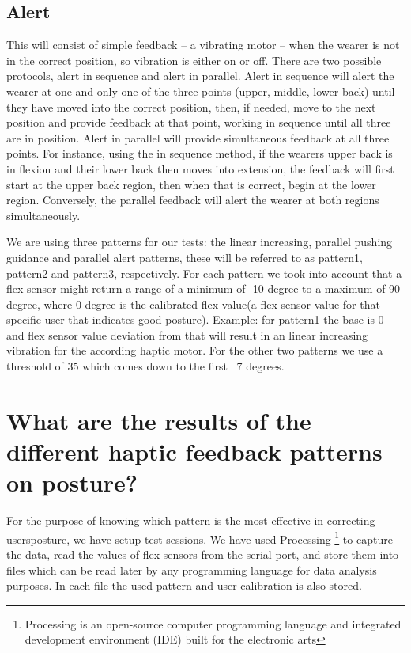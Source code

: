 \documentclass[sigconf]{acmart}
\begin{document}
\subsection{Alert}
This will consist of simple feedback – a vibrating motor – when the wearer is not in the correct position, so vibration is either on or off. There are two possible protocols, alert in sequence and alert in parallel. Alert in sequence will alert the wearer at one and only one of the three points (upper, middle, lower back) until they have moved into the correct position, then, if needed, move to the next position and provide feedback at that point, working in sequence until all three are in position. Alert in parallel will provide simultaneous feedback at all three points. For instance, using the in sequence method, if the wearer\textquotesingle s upper back is in flexion and their lower back then moves into extension, the feedback will first start at the upper back region, then when that is correct, begin at the lower region. Conversely, the parallel feedback will alert the wearer at both regions simultaneously. 



We are using three patterns for our tests: the linear increasing, parallel pushing guidance and parallel alert patterns, these will be referred to as pattern1, pattern2 and pattern3, respectively. For each pattern we took into account that a flex sensor might return a range of a minimum of -10 degree to a maximum of 90 degree, where 0 degree is the calibrated flex value(a flex sensor value for that specific user that indicates good posture). 
Example: for pattern1 the base is 0 and flex sensor value deviation from that will result in an linear increasing vibration for the according haptic motor. For the other two patterns we use a threshold of 35 which comes down to the first ~7 degrees.



\section{What are the results of the different haptic feedback patterns on posture?}

For the purpose of knowing which pattern is the most effective in correcting users\textquotesingle posture, we have setup test sessions. 
We have used Processing \footnote{Processing is an open-source computer programming language and integrated development environment (IDE) built for the electronic arts}  to capture the data, read the values of flex sensors from the serial port, and store them into files which can be read later by any programming language for data analysis purposes. In each file the used pattern and user calibration is also stored.
\end{document}
